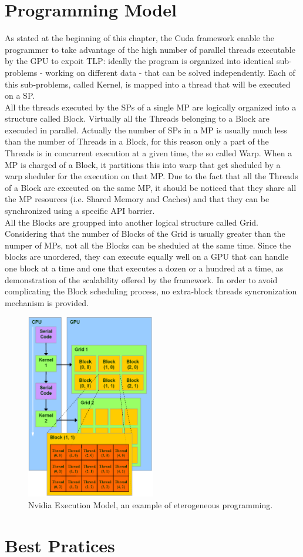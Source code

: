 \section{Programming Model}
As stated at the beginning of this chapter, the Cuda framework enable the programmer to take advantage of the high number of parallel threads executable by the GPU to expoit TLP: ideally the program is organized into identical sub-problems - working on different data - that can be solved independently. Each of this sub-problems, called Kernel, is mapped into a thread that will be executed on a SP.\\
All the threads executed by the SPs of a single MP are logically organized into a structure called Block. Virtually all the Threads belonging to a Block are execuded in parallel. Actually the number of SPs in a MP is usually much less than the number of Threads in a Block, for this reason only a part of the Threads is in concurrent execution at a given time, the so called Warp. When a MP is charged of a Block, it partitions this into warp that get sheduled by a warp sheduler for the execution on that MP. Due to the fact that all the Threads of a Block are executed on the same MP, it should be noticed that they share all the MP resources (i.e. Shared Memory and Caches) and that they can be synchronized using a specific API barrier.\\
All the Blocks are groupped into another logical structure called Grid. Considering that the number of Blocks of the Grid is usually greater than the numper of MPs, not all the Blocks can be sheduled at the same time. Since the blocks are unordered, they can execute equally well on a GPU that can handle one block at a time and one that executes a dozen or a hundred at a time, as demonstration of the scalability offered by the framework. In order to avoid complicating the Block scheduling process, no extra-block threads syncronization mechanism is provided.\\ 

\begin{figure}[h!bt]
	\centerline{\includegraphics[width=0.5\textwidth]{img/NvidiaExecutionModel.png}}
	\caption{Nvidia Execution Model, an example of eterogeneous programming.}
	\label{fig:NvidiaGPUsLogicalOrg}
\end{figure}

\section{Best Pratices}

